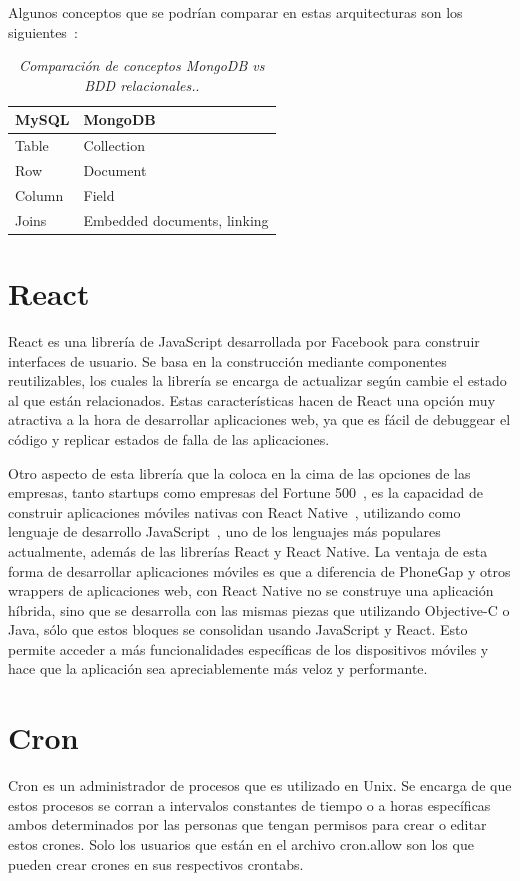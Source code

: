 Algunos conceptos que se podrían comparar en estas arquitecturas son los siguientes~\cite{MongoDBDocs}:

\begin{table}[H]
    \centering
    \begin{tabular}{ | l | l |}
    \hline
	MySQL & MongoDB \\ \hline
	Table & Collection \\ \hline
	Row & Document \\ \hline
	Column & Field \\ \hline
	Joins & Embedded documents, linking \\ \hline
    \end{tabular}
    \caption{\textit{Comparación de conceptos MongoDB vs BDD relacionales.}.}
    \label{tab:mongo-compare}
\end{table}

\section{React} \label{react-section}
React es una librería de JavaScript desarrollada por Facebook para construir interfaces de usuario. Se basa en la construcción mediante componentes reutilizables, los cuales la librería se encarga de actualizar según cambie el estado al que están relacionados. Estas características hacen de React una opción muy atractiva a la hora de desarrollar aplicaciones web, ya que es fácil de debuggear el código y replicar estados de falla de las aplicaciones.

Otro aspecto de esta librería que la coloca en la cima de las opciones de las empresas, tanto startups como empresas del Fortune 500~\cite{reactjs}, es la capacidad de construir aplicaciones móviles nativas con React Native~\cite{reactnative}, utilizando como lenguaje de desarrollo JavaScript~\cite{js}, uno de los lenguajes más populares actualmente, además de las librerías React y React Native.
La ventaja de esta forma de desarrollar aplicaciones móviles es que a diferencia de PhoneGap y otros wrappers de aplicaciones web, con React Native no se construye una aplicación híbrida, sino que se desarrolla con las mismas piezas que utilizando Objective-C o Java, sólo que estos bloques se consolidan usando JavaScript y React.
Esto permite acceder a más funcionalidades específicas de los dispositivos móviles y hace que la aplicación sea apreciablemente más veloz y performante.

\section{Cron}
Cron es un administrador de procesos que es utilizado en Unix. Se encarga de que estos procesos se corran a intervalos constantes de tiempo o a horas específicas ambos determinados por las personas que tengan permisos para crear o editar estos crones. Solo los usuarios que están en el archivo cron.allow son los que pueden crear crones en sus respectivos crontabs. 

